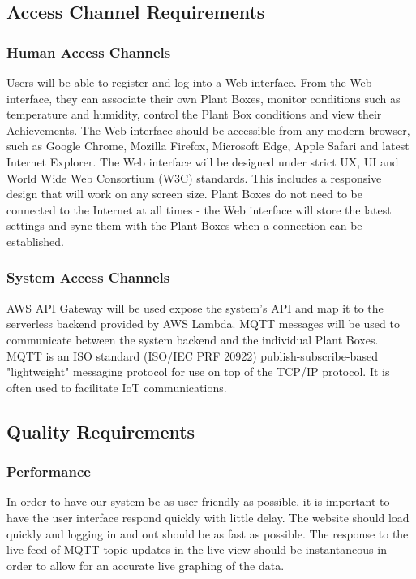 \documentclass{article}
\begin{document}
\subsection{Access Channel Requirements}

\subsubsection{Human Access Channels}
Users will be able to register and log into a Web interface. From the Web interface, they can associate their own Plant Boxes, monitor conditions such as temperature and humidity, control the Plant Box conditions and view their Achievements. The Web interface should be accessible from any modern browser, such as Google Chrome, Mozilla Firefox, Microsoft Edge, Apple Safari and latest Internet Explorer. The Web interface will be designed under strict UX, UI and World Wide Web Consortium (W3C) standards. This includes a responsive design that will work on any screen size. Plant Boxes do not need to be connected to the Internet at all times - the Web interface will store the latest settings and sync them with the Plant Boxes when a connection can be established.

\subsubsection{System Access Channels}
AWS API Gateway will be used expose the system's API and map it to the serverless backend provided by AWS Lambda. MQTT messages will be used to communicate between the system backend and the individual Plant Boxes. MQTT is an ISO standard (ISO/IEC PRF 20922) publish-subscribe-based "lightweight" messaging protocol for use on top of the TCP/IP protocol. It is often used to facilitate IoT communications.

	\subsection{Quality Requirements}
		\subsubsection{Performance}
			In order to have our system be as user friendly as possible, it is important to have the user interface respond quickly with little delay. The website should load quickly and logging in and out should be as fast as possible. The response to the live feed of MQTT topic updates in the live view should be instantaneous in order to allow for an accurate live graphing of the data.
				
\end{document}
